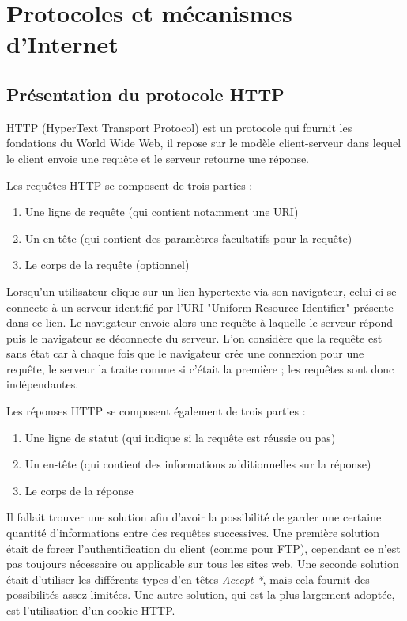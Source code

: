 \chapter{Protocoles et mécanismes d'Internet}

\section{Présentation du protocole HTTP}
\label{http-expl}
HTTP (HyperText Transport Protocol) \cite{Obo_CNP3} est un protocole qui fournit les fondations du World Wide Web, il repose sur le modèle client-serveur dans lequel le client envoie une requête et le serveur retourne une réponse.
\newline

Les requêtes HTTP se composent de trois parties :
\begin{enumerate}
	\item Une ligne de requête (qui contient notamment une URI)
	\item Un en-tête (qui contient des paramètres facultatifs pour la requête)
	\item Le corps de la requête (optionnel)
	\newline
\end{enumerate}

Lorsqu'un utilisateur clique sur un lien hypertexte via son navigateur, celui-ci se connecte à un serveur identifié par l'URI "Uniform Resource Identifier" présente dans ce lien. Le navigateur envoie alors une requête à laquelle le serveur répond puis le navigateur se déconnecte du serveur.
L'on considère que la requête est sans état car à chaque fois que le navigateur crée une connexion pour une requête, le serveur la traite comme si c'était la première ; les requêtes sont donc indépendantes.
\newline

Les réponses HTTP se composent également de trois parties :
\begin{enumerate}
	\item Une ligne de statut (qui indique si la requête est réussie ou pas)
	\item Un en-tête (qui contient des informations additionnelles sur la réponse)
	\item Le corps de la réponse
	\newline
\end{enumerate}

Il fallait trouver une solution afin d'avoir la possibilité de garder une certaine quantité d'informations entre des requêtes successives. Une première solution était de forcer l'authentification du client (comme pour FTP), cependant ce n'est pas toujours nécessaire ou applicable sur tous les sites web. Une seconde solution était d'utiliser les différents types d'en-têtes \emph{Accept-*}, mais cela fournit des possibilités assez limitées. Une autre solution, qui est la plus largement adoptée, est l'utilisation d'un cookie HTTP.
\newline

